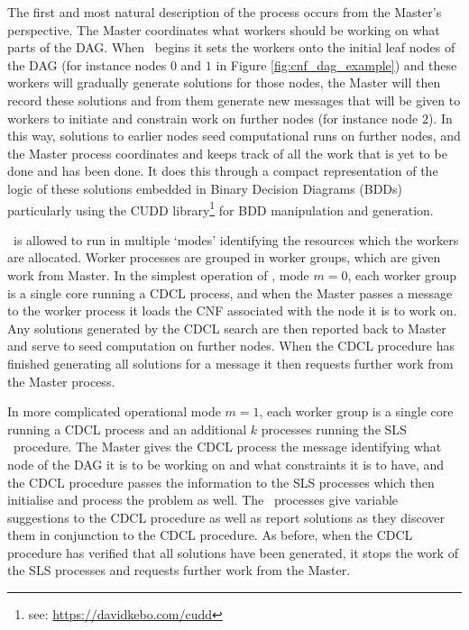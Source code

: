 \documentclass[
10pt, %
a4paper, %
oneside, %
headinclude,footinclude, %
BCOR5mm, %
]{scrartcl}
\begin{document}
The first and most natural description of the process occurs from the Master's perspective. The Master coordinates what workers should be working on what parts of the DAG.
When \dagster\  begins it sets the workers onto the initial leaf nodes of the DAG (for instance nodes $0$ and $1$ in Figure \ref{fig:cnf_dag_example})
and these workers will gradually generate solutions for those nodes, the Master will then record these solutions and from them generate new messages that will be given to workers to
initiate and constrain work on further nodes (for instance node $2$).
In this way, solutions to earlier nodes seed computational runs on further nodes, and the Master process coordinates and keeps track of all the work that is yet to be done and has been done.
It does this through a compact representation of the logic of these solutions embedded in Binary Decision Diagrams (BDDs)
particularly using the CUDD library\footnote{see: \url{https://davidkebo.com/cudd}} for BDD manipulation and generation.

\dagster\  is allowed to run in multiple `modes' identifying the resources which the workers are allocated.
Worker processes are grouped in worker groups, which are given work from Master.
In the simplest operation of \dagster, mode $m=0$, each worker group is a single core running a CDCL process, and when the Master passes a message to the worker process it loads the 
CNF associated with the node it is to work on.
Any solutions generated by the CDCL search are then reported back to Master and serve to seed computation on further nodes.
When the CDCL procedure has finished generating all solutions for a message it then requests further work from the Master process.

In more complicated operational mode $m=1$, each worker group is a single core running a CDCL process and an additional $k$ processes running the SLS \gnoveltyp\ procedure.
The Master gives the CDCL process the message identifying what node of the DAG it is to be working on and what constraints it is to have, and the CDCL procedure passes the information
to the SLS processes which then initialise and process the problem as well.
The \gnoveltyp\ processes give variable suggestions to the CDCL procedure as well as report solutions as they discover them in conjunction to the CDCL procedure.
As before, when the CDCL procedure has verified that all solutions have been generated, it stops the work of the SLS processes and requests further work from the Master.
\end{document}
